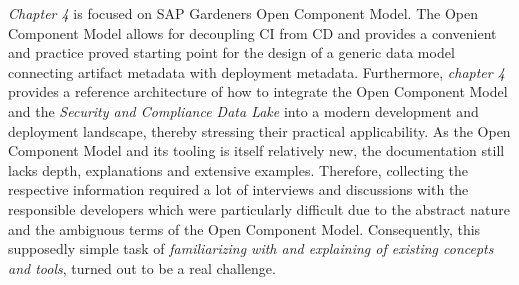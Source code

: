 \emph{Chapter 4} is focused on SAP Gardeners Open Component Model. The Open Component Model allows for decoupling CI from CD and provides a convenient and practice proved starting point for the design of a generic data model connecting artifact metadata with deployment metadata. Furthermore, \emph{chapter 4} provides a reference architecture of how to integrate the Open Component Model and the \emph{Security and Compliance Data Lake} into a modern development and deployment landscape, thereby stressing their practical applicability. As the Open Component Model and its tooling is itself relatively new, the documentation still lacks depth, explanations and extensive examples. Therefore, collecting the respective information required a lot of interviews and discussions with the responsible developers which were particularly difficult due to the abstract nature and the ambiguous terms of the Open Component Model. Consequently, this supposedly simple task of \emph{familiarizing with and explaining of existing concepts and tools}, turned out to be a real challenge.\\

